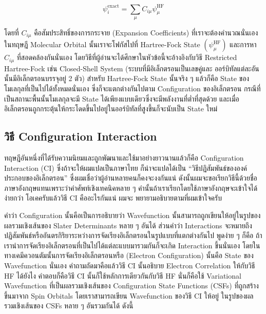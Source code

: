 \begin{equation}
    \label{eq:Exact_Wavefunction}
    \psi^{\text{exact}}_{i} = \sum_{\mu} C_{i \mu} \psi^{\text{HF}}_{\mu}
\end{equation}

\noindent โดยที่ $C_{i \mu}$ คือสัมประสิทธิ์ของการกระจาย (Expansion Coefficients) ที่เราจะต้องคำนวณนั่นเอง ในทฤษฎี Molecular 
Orbital นั้นเราจะโฟกัสไปที่ Hartree-Fock State $(\psi^{\text{HF}}_{\mu})$ และการหา $C_{i \mu}$ ที่สอดคล้องกันนั่นเอง 
โดยวิธีที่ผู้อ่านจะได้ศึกษาในหัวข้อนี้จะอ้างอิงกับวิธี Restricted Hartree-Fock เช่น Closed-Shell System (ระบบที่มีอิเล็กตรอนเป็นเลขคู่และ%
ออร์บิทัลแต่ละอันนั้นมีอิเล็กตรอนบรรจุอยู่ 2 ตัว) สำหรับ Hartree-Fock State นั้นจริง ๆ แล้วก็คือ State ของโมเลกุลที่เป็นไปได้ทั้งหมดนั่นเอง%
ซึ่งก็จะแตกต่างกันไปตาม Configuration ของอิเล็กตรอน กรณีที่เป็นสถานะพื้นนั้นโมเลกุลจะมี State ได้เพียงแบบเดียวซึ่งจะมีพลังงานที่ต่ำที่สุดด้วย%
และเมื่ออิเล็กตรอนถูกกระตุ้นให้กระโดดขึ้นไปอยู่ในออร์บิทัลที่สูงขึ้นก็จะนับเป็น State ใหม่

\subsection{วิธี Configuration Interaction}

ทฤษฎีอันหนึ่งที่ได้รับความนิยมและถูกพัฒนาและใช้มาอย่างยาวนานแล้วก็คือ Configuration Interaction (CI) ซึ่งถ้าจะให้ผมแปลเป็นภาษาไทย%
ก็น่าจะแปลได้เป็น \enquote{วิธีปฏิสัมพันธ์ขององค์ประกอบของอิเล็กตรอน} ซึ่งผมเชื่อว่าผู้อ่านหลายคนก็คงจะงงกันแน่ ดังนั้นผมจะขอเรียกวิธีนี้ด้วยชื่อ%
ภาษาอังกฤษแทนเพราะว่าคำศัพท์เชิงเทคนิคหลาย ๆ คำนั้นถ้าเราเรียกโดยใช้ภาษาอังกฤษจะเข้าใจได้ง่ายกว่า โอเคครับแล้ววิธี CI คืออะไรกันแน่ ผมจะ%
พยายามอธิบายตามที่ผมเข้าใจครับ

คำว่า Configuration นั้นคือเป็นการอธิบายว่า Wavefunction นั้นสามารถถูกเขียนให้อยู่ในรูปของผลรวมเชิงเส้นของ Slater Determinants 
หลาย ๆ อันได้ ส่วนคำว่า Interactions จะหมายถึงปฏิสัมพันธ์หรืออันตรกิริยาระหว่างการจัดเรียงอิเล็กตรอนในรูปแบบที่แตกต่างกันไป พูดง่าย ๆ ก็คือ%
ถ้าเรานำการจัดเรียงอิเล็กตรอนที่เป็นไปได้แต่ละแบบมารวมกันก็จะเกิด Interaction ขึ้นนั่นเอง โดยในทางเคมีควอนตัมนั้นการจัดเรียงอิเล็กตรอนหรือ 
(Electron Configuration) นั้นคือ State ของ Wavefunction นั่นเอง คำถามถัดมาคือแล้ววิธี CI นั้นอธิบาย Electron Correlation 
ให้กับวิธี HF ได้ยังไง คำตอบก็คือวิธี CI นั้นก็ใช้หลักการเดียวกันกับวิธี HF นั่นก็คือใช้ Variational Wavefunction ที่เป็นผลรวมเชิงเส้นของ 
Configuration State Functions (CSFs) ที่ถูกสร้างขึ้นมาจาก Spin Orbitals โดยเราสามารถเขียน Wavefunction ของวิธี CI ให้อยู่%
ในรูปของผลรวมเชิงเส้นของ CSFs หลาย ๆ อันรวมกันได้ ดังนี้

